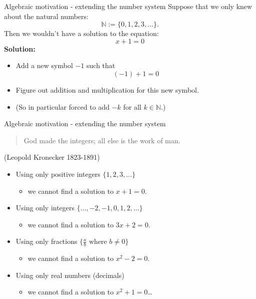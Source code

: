 \documentclass{beamer}
\begin{document}
\begin{frame}{Algebraic motivation - extending the number system}
Suppose that we only knew about the natural numbers:
\begin{equation*}
\mathbb{N} := \{0, 1, 2, 3, \dots\}.
\end{equation*}
Then we wouldn't have a solution to the equation:
\begin{equation*}
 x + 1 = 0
\end{equation*}
{\bf Solution:}
\begin{itemize}
	\item Add a new symbol $-1$ such that
	\begin{equation*}
	(-1)+1 = 0
	\end{equation*}
	\item Figure out addition and multiplication for this new symbol.
	\item (So in particular forced to add $-k$ for all $k\in \mathbb{N}$.)
\end{itemize}
\end{frame}

\begin{frame}{Algebraic motivation - extending the number system}
\begin{quote}
God made the integers; all else is the work of man.
\end{quote}
(Leopold Kronecker 1823-1891)\vfill
\begin{itemize}
	\item Using only positive integers $\{1, 2, 3, \dots\}$
	\begin{itemize}
		\item we cannot find a solution to $x+1 = 0$.
	\end{itemize}\vfill
	\item Using only integers $\{\dots, -2, -1, 0, 1, 2, \dots\}$
	\begin{itemize}
		\item we cannot find a solution to $3x+2 = 0$.
	\end{itemize}\vfill
	\item Using only fractions $\{\frac{a}{b} \text{ where } b\neq0 \}$
	\begin{itemize}
		\item we cannot find a solution to $x^2-2 =0$.
	\end{itemize}\vfill
	\item Using only real numbers (decimals)
	\begin{itemize}
		\item we cannot find a solution to $x^2 + 1 = 0$\dots
	\end{itemize}
\end{itemize}
\end{frame}
\end{document}
